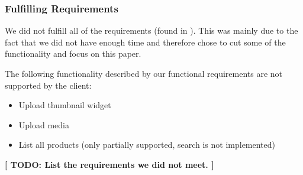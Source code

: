 \subsubsection{Fulfilling Requirements}
We did not fulfill all of the requirements (found in ). This was mainly due to the fact that we did not have enough time and therefore chose to cut some of the functionality and focus on this paper.

The following functionality described by our functional requirements are not supported by the client:
\begin{itemize}
	\item Upload thumbnail widget
	\item Upload media
	\item List all products (only partially supported, search is not implemented)
\end{itemize}

\textbf{[ TODO: List the requirements we did not meet. ]}